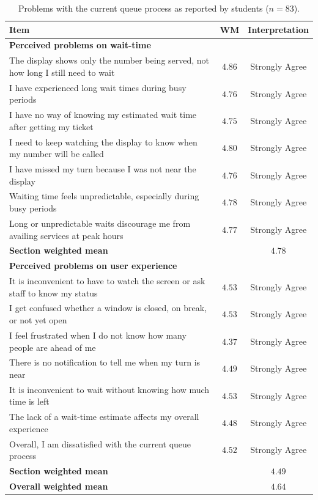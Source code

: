 \documentclass{research}
\begin{document}
\begin{table}[!tbp]
\centering
\caption{Problems with the current queue process as reported by
students ($n = 83$).}
\label{tab:sop1-students}
\begin{tabular}{p{}cc}
\hline
Item & WM & Interpretation \\
\hline
\multicolumn{3}{l}{\textbf{Perceived problems on wait-time}} \\
The display shows only the number being served, not how long I still
  need to wait & $4.86$ & Strongly Agree \\
I have experienced long wait times during busy periods & $4.76$ & Strongly Agree \\
I have no way of knowing my estimated wait time after getting my ticket
  & $4.75$ & Strongly Agree \\
I need to keep watching the display to know when my number will be
  called & $4.80$ & Strongly Agree \\
I have missed my turn because I was not near the display & $4.76$ & Strongly Agree \\
Waiting time feels unpredictable, especially during busy periods & $4.78$ & Strongly Agree \\
Long or unpredictable waits discourage me from availing services at
  peak hours & $4.77$ & Strongly Agree \\
\hline
\multicolumn{2}{l}{\textbf{Section weighted mean}} & $4.78$ \\
\hline
\multicolumn{3}{l}{\textbf{Perceived problems on user experience}} \\
It is inconvenient to have to watch the screen or ask staff to know my
  status & $4.53$ & Strongly Agree \\
I get confused whether a window is closed, on break, or not yet open & $4.53$ & Strongly Agree \\
I feel frustrated when I do not know how many people are ahead of me & $4.37$ & Strongly Agree \\
There is no notification to tell me when my turn is near & $4.49$ & Strongly Agree \\
It is inconvenient to wait without knowing how much time is left & $4.53$ & Strongly Agree \\
The lack of a wait-time estimate affects my overall experience & $4.48$ & Strongly Agree \\
Overall, I am dissatisfied with the current queue process & $4.52$ & Strongly Agree \\
\hline
\multicolumn{2}{l}{\textbf{Section weighted mean}} & $4.49$ \\
\hline
\multicolumn{2}{l}{\textbf{Overall weighted mean}} & $\mathbf{4.64}$ \\
\hline
\end{tabular}
\end{table}
\end{document}
